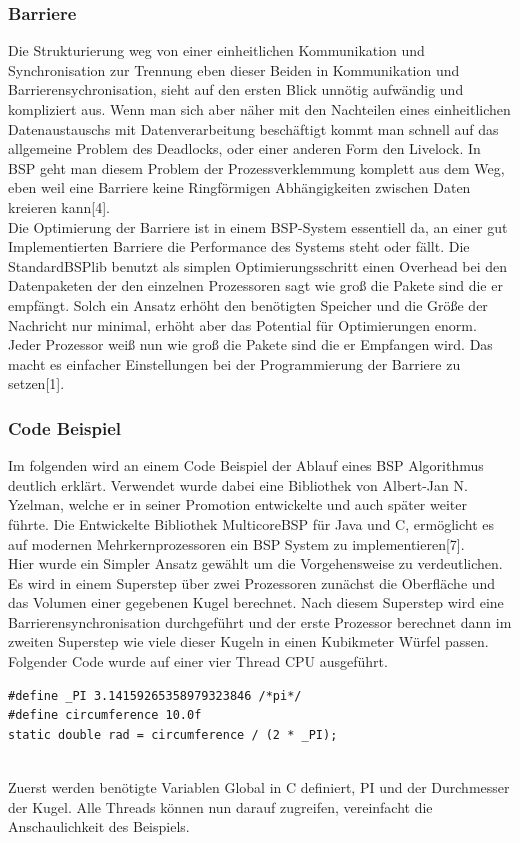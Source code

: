 \documentclass[a4paper,10pt]{scrartcl}
\begin{document}
\subsubsection{Barriere}
Die Strukturierung weg von einer einheitlichen Kommunikation und Synchronisation zur Trennung eben dieser Beiden in Kommunikation und Barrierensychronisation, sieht auf den ersten Blick unnötig aufwändig und kompliziert aus. Wenn man sich aber näher mit den Nachteilen eines einheitlichen Datenaustauschs mit Datenverarbeitung beschäftigt kommt man schnell auf das allgemeine Problem des Deadlocks, oder 	einer anderen Form den Livelock. In BSP geht man diesem Problem der Prozessverklemmung komplett aus dem Weg, eben weil eine Barriere keine Ringförmigen Abhängigkeiten zwischen Daten kreieren kann[4].\\
Die Optimierung der Barriere ist in einem BSP-System essentiell da, an einer gut Implementierten Barriere die Performance des Systems steht oder fällt. Die StandardBSPlib benutzt als simplen Optimierungsschritt einen Overhead bei den Datenpaketen der den einzelnen Prozessoren sagt wie groß die Pakete sind die er empfängt. Solch ein Ansatz erhöht den benötigten Speicher und die Größe der Nachricht nur minimal, erhöht aber das Potential für Optimierungen enorm. Jeder Prozessor weiß nun wie groß die Pakete sind die er Empfangen wird. Das macht es einfacher Einstellungen bei der Programmierung der Barriere zu setzen[1].
\newpage

\subsubsection{Code Beispiel}
Im folgenden wird an einem Code Beispiel der Ablauf eines BSP Algorithmus deutlich erklärt. Verwendet wurde dabei eine Bibliothek von Albert-Jan N. Yzelman, welche er in seiner Promotion entwickelte und auch später weiter führte. Die Entwickelte Bibliothek MulticoreBSP für Java und C, ermöglicht es auf modernen Mehrkernprozessoren ein BSP System zu implementieren[7].\\
Hier wurde ein Simpler Ansatz gewählt um die Vorgehensweise zu verdeutlichen. Es wird in einem Superstep über zwei Prozessoren zunächst die Oberfläche und das Volumen einer gegebenen Kugel berechnet. Nach diesem Superstep wird eine Barrierensynchronisation durchgeführt und der erste Prozessor berechnet dann im zweiten Superstep wie viele dieser Kugeln in einen Kubikmeter Würfel passen. Folgender Code wurde auf einer vier Thread CPU ausgeführt.
\begin{lstlisting}
#define _PI 3.14159265358979323846 /*pi*/
#define circumference 10.0f
static double rad = circumference / (2 * _PI);
   
\end{lstlisting}
Zuerst werden benötigte Variablen Global in C definiert, PI und der Durchmesser der Kugel. Alle Threads können nun darauf zugreifen, vereinfacht die Anschaulichkeit des Beispiels.
\end{document}
